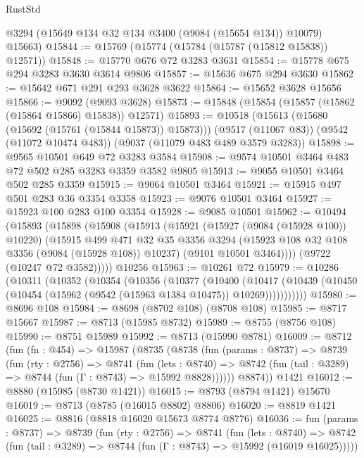 \begin{lexlean}{RustStd}
\begin{coremodule}
      @3294
      (@15649 @134 @32 @134 @3400 (@9084 (@15654 @134)) @10079)
      @15663)
@15844 := @15769 (@15774 (@15784 (@15787 (@15812 @15838)) @12571))
@15848 := @15770 @676 @72 @3283 @3631
@15854 := @15778 @675 @294 @3283 @3630 @3614 @9806
@15857 := @15636 @675 @294 @3630
@15862 := @15642 @671 @291 @293 @3628 @3622
@15864 := @15652 @3628 @15656
@15866 := @9092 (@9093 @3628)
@15873 := @15848 (@15854 (@15857 (@15862 (@15864 @15866) @15838)) @12571)
@15893 := @10518
    (@15613 (@15680 (@15692 (@15761 (@15844 @15873)) @15873)))
    (@9517 (@11067 @83))
    (@9542 (@11072 @10474 @483))
    (@9037 (@11079 @483 @489 @3579 @3283))
@15898 := @9565 @10501 @649 @72 @3283 @3584
@15908 := @9574 @10501 @3464 @483 @72 @502 @285 @3283 @3359 @3582 @9805
@15913 := @9055 @10501 @3464 @502 @285 @3359
@15915 := @9064 @10501 @3464
@15921 := @15915 @497 @501 @283 @36 @3354 @3358
@15923 := @9076 @10501 @3464
@15927 := @15923 @100 @283 @100 @3354
@15928 := @9085 @10501
@15962 := @10494
    (@15893
      (@15898
        (@15908
          (@15913
            (@15921
              (@15927 (@9084 (@15928 @100)) @10220)
              (@15915
                @499
                @471
                @32
                @35
                @3356
                @3294
                (@15923 @108 @32 @108 @3356 (@9084 (@15928 @108)) @10237)
                (@9101 @10501 @3464))))
          (@9722 (@10247 @72 @3582)))))
    @10256
@15963 := @10261 @72
@15979 := @10286
    (@10311
      (@10352
        (@10354
          (@10356
            (@10377
              (@10400
                (@10417
                  (@10439 (@10450 (@10454 (@15962 (@9542 (@15963 @1384 @10475)) @10269)))))))))))
@15980 := @8696 @108
@15984 := @8698 (@8702 @108) (@8708 @108)
@15985 := @8717 @15667
@15987 := @8713 (@15985 @8732)
@15989 := @8755 (@8756 @108)
@15990 := @8751 @15989
@15992 := @8713 (@15990 @8781)
@16009 := @8712
    (fun (fn : @454) =>
    @15987
      (@8735
        (@8738
          (fun (params : @8737) =>
          @8739
            (fun (rty : @2756) =>
            @8741
              (fun (lets : @8740) =>
              @8742 (fun (tail : @3289) => @8744 (fun (Γ : @8743) => @15992 @8828))))))
        @8874))
    @1421
@16012 := @8880 (@15985 (@8730 @1421))
@16015 := @8793 (@8794 @1421) @15670
@16019 := @8713 (@8785 (@16015 @8802) @8806)
@16020 := @8819 @1421
@16025 := @8816 (@8818 @16020 @15673 @8774 @8776)
@16036 := fun (params : @8737) =>
  @8739
    (fun (rty : @2756) =>
    @8741
      (fun (lets : @8740) =>
      @8742 (fun (tail : @3289) => @8744 (fun (Γ : @8743) => @15992 (@16019 @16025)))))

\end{coremodule}
\end{lexlean}
